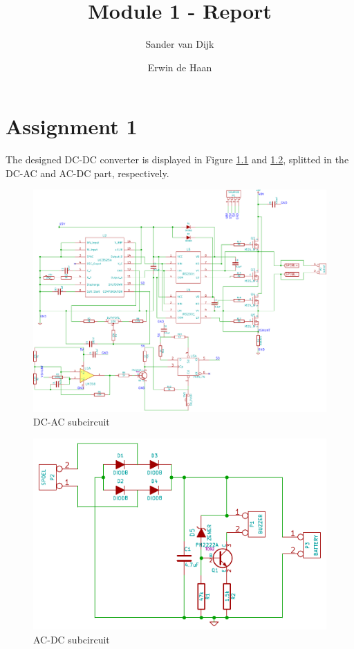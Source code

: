 \documentclass[final]{scrreprt} %
\title{Module 1 - Report}
\author{Sander {van Dijk} \and Erwin {de Haan}}
\begin{document}
\chapter{Assignment 1}
The designed DC-DC converter is displayed in Figure \ref{fig:DC-AC} and \ref{fig:AC-DC}, splitted in the DC-AC and AC-DC part, respectively.

\begin{figure}[h]
	\includegraphics[width=\linewidth]{resources/DC-AC-rc.pdf}
	\caption{DC-AC subcircuit}
	\label{fig:DC-AC}
\end{figure}

\begin{figure}[h]
	\includegraphics[width=\linewidth]{resources/AC-DC-rc.pdf}
	\caption{AC-DC subcircuit}
	\label{fig:AC-DC}
\end{figure}
\end{document}
